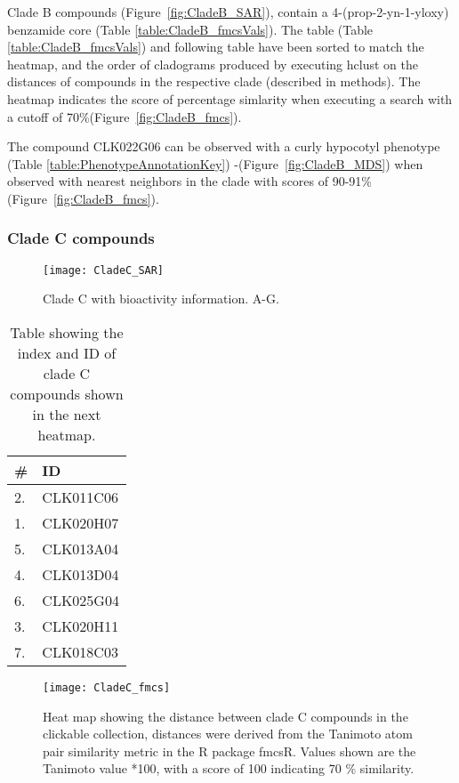 Clade B compounds (Figure~\ref{fig:CladeB_SAR}), contain a 4-(prop-2-yn-1-yloxy) benzamide core (Table \ref{table:CladeB_fmcsVals}). The table (Table \ref{table:CladeB_fmcsVals}) and following table have been sorted to match the heatmap, and the order of cladograms produced by executing hclust on the distances of compounds in the respective clade (described in methods). The heatmap indicates the score of percentage simlarity when executing a search with a cutoff of 70{\%}(Figure~\ref{fig:CladeB_fmcs}).

The compound CLK022G06 can be observed with a curly hypocotyl phenotype (Table \ref{table:PhenotypeAnnotationKey}) -(Figure~\ref{fig:CladeB_MDS}) when observed with nearest neighbors in the clade with scores of 90-91{\%}(Figure~\ref{fig:CladeB_fmcs}). 

\subsubsection{Clade C compounds}


\begin{figure}
\texttt{[image: CladeC\_SAR]}
\caption{Clade C with bioactivity information. A-G.}
\label{fig:CladeC_SAR}
\end{figure}




\begin{table}\centering
    \begin{tabular}{|l|l|}
    \hline
   # & ID \\ \hline 
 2. & CLK011C06 \\ \hline
1. & CLK020H07 \\ \hline
5. & CLK013A04  \\ \hline
4. & CLK013D04  \\ \hline
6. & CLK025G04  \\ \hline
3. & CLK020H11  \\ \hline
7. & CLK018C03  \\ \hline
    \end{tabular}
    \caption {Table showing the  index and ID of clade C compounds shown in the next heatmap.}   
    \label{table:CladeC_fmcsVals}
\end{table}


\begin{figure}\centering
\texttt{[image: CladeC\_fmcs]}
\caption{Heat map showing the distance between clade C compounds in the clickable collection, distances were derived from the Tanimoto atom pair similarity metric in the R package fmcsR. Values shown are the Tanimoto value *100, with a score of 100 indicating 70 {\%} similarity.}
\label{fig:CladeC_fmcs}
\end{figure}


